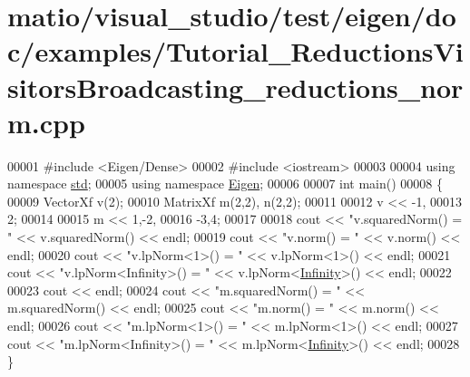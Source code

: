 \hypertarget{matio_2visual__studio_2test_2eigen_2doc_2examples_2_tutorial___reductions_visitors_broadcasting__reductions__norm_8cpp_source}{}\section{matio/visual\+\_\+studio/test/eigen/doc/examples/\+Tutorial\+\_\+\+Reductions\+Visitors\+Broadcasting\+\_\+reductions\+\_\+norm.cpp}
\label{matio_2visual__studio_2test_2eigen_2doc_2examples_2_tutorial___reductions_visitors_broadcasting__reductions__norm_8cpp_source}

\begin{DoxyCode}
00001 \textcolor{preprocessor}{#include <Eigen/Dense>}
00002 \textcolor{preprocessor}{#include <iostream>}
00003 
00004 \textcolor{keyword}{using namespace }\hyperlink{namespacestd}{std};
00005 \textcolor{keyword}{using namespace }\hyperlink{namespace_eigen}{Eigen};
00006 
00007 \textcolor{keywordtype}{int} main()
00008 \{
00009   VectorXf v(2);
00010   MatrixXf m(2,2), n(2,2);
00011   
00012   v << -1,
00013        2;
00014   
00015   m << 1,-2,
00016        -3,4;
00017 
00018   cout << \textcolor{stringliteral}{"v.squaredNorm() = "} << v.squaredNorm() << endl;
00019   cout << \textcolor{stringliteral}{"v.norm() = "} << v.norm() << endl;
00020   cout << \textcolor{stringliteral}{"v.lpNorm<1>() = "} << v.lpNorm<1>() << endl;
00021   cout << \textcolor{stringliteral}{"v.lpNorm<Infinity>() = "} << v.lpNorm<\hyperlink{namespace_eigen_a7951593b031e13d90223c83d022ce99e}{Infinity}>() << endl;
00022 
00023   cout << endl;
00024   cout << \textcolor{stringliteral}{"m.squaredNorm() = "} << m.squaredNorm() << endl;
00025   cout << \textcolor{stringliteral}{"m.norm() = "} << m.norm() << endl;
00026   cout << \textcolor{stringliteral}{"m.lpNorm<1>() = "} << m.lpNorm<1>() << endl;
00027   cout << \textcolor{stringliteral}{"m.lpNorm<Infinity>() = "} << m.lpNorm<\hyperlink{namespace_eigen_a7951593b031e13d90223c83d022ce99e}{Infinity}>() << endl;
00028 \}
\end{DoxyCode}
